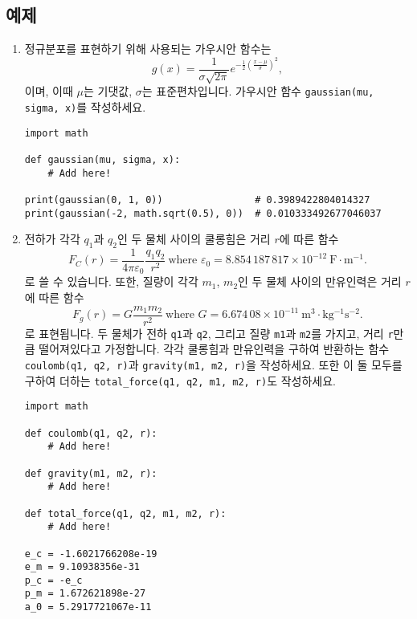 \documentclass[../main.tex]{subfiles}
\begin{document}
\subsection{예제}
\begin{enumerate}
  \item 정규분포를 표현하기 위해 사용되는 가우시안 함수는
    \[
    g(x) = \frac{1}{\sigma \sqrt{2\pi}} e^{-\frac12 \left(\frac{x - \mu}{\sigma}\right)^2},
    \]
    이며, 이때 $\mu$는 기댓값, $\sigma$는 표준편차입니다.
    가우시안 함수 \verb|gaussian(mu, sigma, x)|를 작성하세요.
\begin{verbatim}
import math

def gaussian(mu, sigma, x):
    # Add here!

print(gaussian(0, 1, 0))                # 0.3989422804014327
print(gaussian(-2, math.sqrt(0.5), 0))  # 0.010333492677046037
\end{verbatim}

\item 전하가 각각 $q_1$과 $q_2$인 두 물체 사이의 쿨롱힘은 거리 $r$에 따른 함수
\[
  F_C(r) = \frac{1}{4\pi \varepsilon_0} \frac{q_1 q_2}{r^2}\ \text{where $\varepsilon_0 = 8.854\,187\,817 \times 10^{-12}\ \mathrm{F \cdot m^{-1}}$}.
\]
로 쓸 수 있습니다.
또한, 질량이 각각 $m_1$, $m_2$인 두 물체 사이의 만유인력은 거리 $r$에 따른 함수
\[
  F_g(r) = G \frac{m_1 m_2}{r^2}\ \text{where $G = 6.674\,08 \times 10^{-11}\ \mathrm{m^3 \cdot kg^{-1} s^{-2}}$}.
\]
로 표현됩니다.
두 물체가 전하 \texttt{q1}과 \texttt{q2}, 그리고 질량 \texttt{m1}과
\texttt{m2}를 가지고, 거리 \texttt{r}만큼 떨어져있다고 가정합니다.
각각 쿨롱힘과 만유인력을 구하여 반환하는 함수 \verb|coulomb(q1, q2, r)|과
\verb|gravity(m1, m2, r)|을 작성하세요.
또한 이 둘 모두를 구하여 더하는 \texttt{total\_force(q1, q2, m1, m2, r)}도
작성하세요.
\begin{verbatim}
import math

def coulomb(q1, q2, r):
    # Add here!

def gravity(m1, m2, r):
    # Add here!

def total_force(q1, q2, m1, m2, r):
    # Add here!

e_c = -1.6021766208e-19
e_m = 9.10938356e-31
p_c = -e_c
p_m = 1.672621898e-27
a_0 = 5.2917721067e-11


\end{verbatim}
\end{enumerate}
\end{document}
